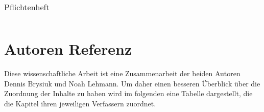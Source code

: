 \begin{table}[H]
\begin{center}
\begin{tabular}{| l | l | l | l |}
  \end{tabular}
  \end{center}
\caption[Pflichtenheft]{Pflichtenheft}
\label{tab:lastenheft}
\end{table}

\newpage

\section*{Autoren Referenz}

Diese wissenschaftliche Arbeit ist eine Zusammenarbeit der beiden Autoren Dennis Brysiuk und Noah Lehmann. Um daher einen besseren Überblick über die Zuordnung der Inhalte zu haben wird im folgenden eine Tabelle dargestellt, die die Kapitel ihren jeweiligen Verfassern zuordnet.

